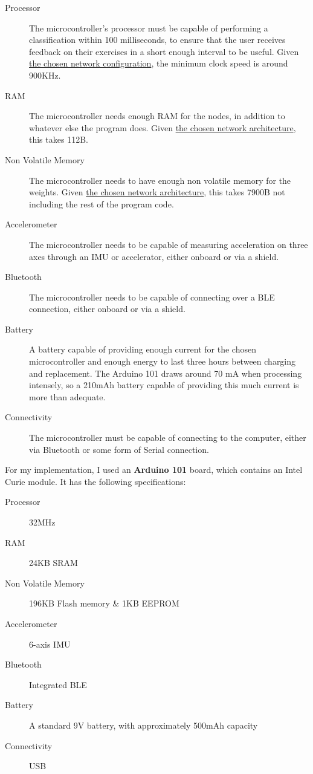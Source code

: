 \documentclass[a4paper]{article}
\begin{document}
\begin{description}
\item[Processor] The microcontroller's processor must be capable of performing a classification within 100 milliseconds, to ensure that the user receives feedback on their exercises in a short enough interval to be useful. Given \hyperref[subsec:dc_networkarchitecture]{the chosen network configuration}, the minimum clock speed is around 900KHz.\cite{dsref0}
\item[RAM] The microcontroller needs enough RAM for the nodes, in addition to whatever else the program does. Given \hyperref[subsec:dc_networkarchitecture]{the chosen network architecture}, this takes 112B.
\item[Non Volatile Memory] The microcontroller needs to have enough non volatile memory for the weights. Given \hyperref[subsec:dc_networkarchitecture]{the chosen network architecture}, this takes 7900B not including the rest of the program code\cite{dsref2}.
\item[Accelerometer] The microcontroller needs to be capable of measuring acceleration on three axes through an IMU or accelerator, either onboard or via a shield.
\item[Bluetooth] The microcontroller needs to be capable of connecting over a BLE connection, either onboard or via a shield.
\item[Battery] A battery capable of providing enough current for the chosen microcontroller and enough energy to last three hours between charging and replacement. The Arduino 101 draws around 70 mA when processing intensely,\cite{dsref3} so a 210mAh battery capable of providing this much current is more than adequate.
\item[Connectivity] The microcontroller must be capable of connecting to the computer, either via Bluetooth or some form of Serial connection.
\end{description}

For my implementation, I used an \textbf{Arduino 101} board, which contains an Intel Curie module. It has the following specifications:\cite{dsref4}

\begin{description}
\item[Processor] 32MHz
\item[RAM] 24KB SRAM
\item[Non Volatile Memory] 196KB Flash memory \& 1KB EEPROM
\item[Accelerometer] 6-axis IMU
\item[Bluetooth] Integrated BLE 
\item[Battery] A standard 9V battery, with approximately 500mAh capacity\cite{dsref5}
\item[Connectivity] USB
\end{description}
\end{document}
